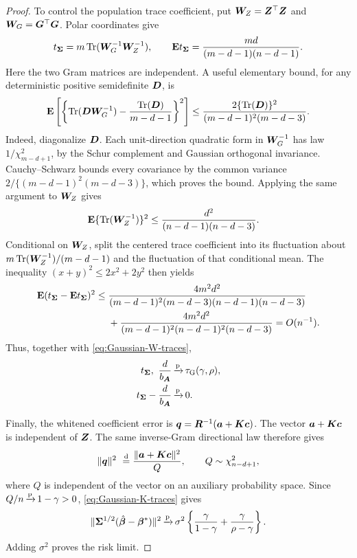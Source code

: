 \documentclass{article}
\theoremstyle{plain} %
\theoremstyle{definition} %
\theoremstyle{definition} %
\begin{document}
\begin{proof}
To control the population trace coefficient, put
$\boldsymbol{W}_Z=\boldsymbol{Z}^\top\boldsymbol{Z}$ and $\boldsymbol{W}_G=\boldsymbol{G}^\top\boldsymbol{G}$. Polar coordinates give
\begin{align*}
    t_{\boldsymbol{\Sigma}}=m\operatorname{Tr}(\boldsymbol{W}_G^{-1}\boldsymbol{W}_Z^{-1}),
    \qquad
    {\mathbf{E}} t_{\boldsymbol{\Sigma}}=\frac{md}{(m-d-1)(n-d-1)}.
\end{align*}
Here the two Gram matrices are independent. A useful elementary bound,
for any deterministic positive semidefinite $\boldsymbol{D}$, is
\begin{align*}
    {\mathbf{E}}\left[
      \left\{\operatorname{Tr}(\boldsymbol{D}\boldsymbol{W}_G^{-1})-
             \frac{\operatorname{Tr}(\boldsymbol{D})}{m-d-1}\right\}^2\right]
    \leq\frac{2\{\operatorname{Tr}(\boldsymbol{D})\}^2}{(m-d-1)^2(m-d-3)}.
\end{align*}
Indeed, diagonalize $\boldsymbol{D}$. Each unit-direction quadratic form in
$\boldsymbol{W}_G^{-1}$ has law $1/\chi^2_{m-d+1}$, by the Schur complement and
Gaussian orthogonal invariance. Cauchy--Schwarz bounds every covariance
by the common variance $2/\{(m-d-1)^2(m-d-3)\}$, which proves the bound.
Applying the same argument to $\boldsymbol{W}_Z$ gives
\begin{align*}
    {\mathbf{E}}\{\operatorname{Tr}(\boldsymbol{W}_Z^{-1})\}^2
       &\leq\frac{d^2}{(n-d-1)(n-d-3)}.
\end{align*}
Conditional on $\boldsymbol{W}_Z$, split the centered trace coefficient into
its fluctuation about $m\operatorname{Tr}(\boldsymbol{W}_Z^{-1})/(m-d-1)$ and the fluctuation
of that conditional mean. The inequality $(x+y)^2\leq2x^2+2y^2$ then yields
\begin{align*}
    {\mathbf{E}}(t_{\boldsymbol{\Sigma}}-{\mathbf{E}} t_{\boldsymbol{\Sigma}})^2
    \leq{}&
    \frac{4m^2d^2}
    {(m-d-1)^2(m-d-3)(n-d-1)(n-d-3)}\\
    &+\frac{4m^2d^2}
    {(m-d-1)^2(n-d-1)^2(n-d-3)}=O(n^{-1}).
\end{align*}
Thus, together with \eqref{eq:Gaussian-W-traces},
\begin{align}
    t_{\boldsymbol{\Sigma}},\ \frac{d}{b_{\boldsymbol{A}}}
    &{\,\smash{\xrightarrow{\mathrm{p}}}}\,\tau_{\rm G}(\gamma,\rho),\notag\\
    t_{\boldsymbol{\Sigma}}-\frac{d}{b_{\boldsymbol{A}}}&{\,\smash{\xrightarrow{\mathrm{p}}}}\,0.
    \label{eq:Gaussian-trace-limits}
\end{align}

Finally, the whitened coefficient error is
$\boldsymbol{q}=\boldsymbol{R}^{-1}(\boldsymbol{a}+\boldsymbol{K}\boldsymbol{c})$. The vector $\boldsymbol{a}+\boldsymbol{K}\boldsymbol{c}$ is independent
of $\boldsymbol{Z}$. The same inverse-Gram directional law therefore gives
\begin{align*}
    \lVert\boldsymbol{q}\rVert^2
       \ \stackrel{\rm d}{=}
       \frac{\lVert\boldsymbol{a}+\boldsymbol{K}\boldsymbol{c}\rVert^2}{Q},
    \qquad Q\sim\chi^2_{n-d+1},
\end{align*}
where $Q$ is independent of the vector on an auxiliary probability space.
Since $Q/n{\,\smash{\xrightarrow{\mathrm{p}}}}\,1-\gamma>0$, \eqref{eq:Gaussian-K-traces} gives
\begin{align*}
    \lVert\boldsymbol{\Sigma}^{1/2}(\hat{\boldsymbol{\beta}}{}-\boldsymbol{\beta}^*)\rVert^2
    {\,\smash{\xrightarrow{\mathrm{p}}}}\,\sigma^2\left\{
       \frac{\gamma}{1-\gamma}+\frac{\gamma}{\rho-\gamma}\right\}.
\end{align*}
Adding $\sigma^2$ proves the risk limit.


\end{proof}
\end{document}
